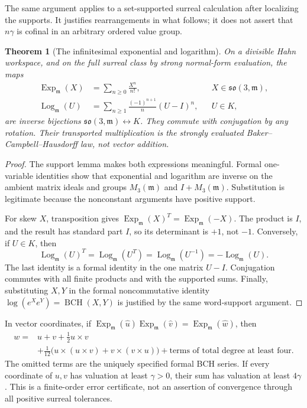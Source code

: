\documentclass[11pt,letterpaper]{article}
\numberwithin{equation}{section}
\newtheorem{theorem}{Theorem}[section]
\theoremstyle{definition}
\theoremstyle{remark}
\newcommand{\mm}{\mathfrak m}
\newcommand{\so}{\mathfrak{so}}
\newcommand{\Exp}{\operatorname{Exp}}
\newcommand{\Log}{\operatorname{Log}}
\begin{document}
The same argument applies to a set-supported surreal calculation after
localizing the supports. It justifies rearrangements in what follows; it does
not assert that \(n\gamma\) is cofinal in an arbitrary ordered value group.

\begin{theorem}[The infinitesimal exponential and logarithm]\label{e3:so:thm:explog}
On a divisible Hahn workspace, and on the full surreal class by strong
normal-form evaluation, the maps
\begin{align}
 \Exp_{\mm}(X)&=\sum_{n\ge0}\frac{X^n}{n!},
       &&X\in\so(3,\mm),\label{e3:so:eq:infexp}\\
 \Log_{\mm}(U)&=\sum_{n\ge1}\frac{(-1)^{n+1}}n(U-I)^n,
       &&U\in K,\label{e3:so:eq:inflog}
\end{align}
are inverse bijections \(\so(3,\mm)\leftrightarrow K\).
They commute with conjugation by any rotation. Their transported multiplication
is the strongly evaluated Baker--Campbell--Hausdorff law, not vector addition.
\end{theorem}
\begin{proof}
The support lemma makes both expressions meaningful. Formal one-variable
identities show that exponential and logarithm are inverse on the ambient
matrix ideals and groups \(M_3(\mm)\) and \(I+M_3(\mm)\). Substitution is
legitimate because the nonconstant arguments have positive support.

For skew \(X\), transposition gives \(\Exp_{\mm}(X)^T=\Exp_{\mm}(-X)\).
The product is \(I\), and the result has standard part \(I\), so its determinant
is \(+1\), not \(-1\). Conversely, if \(U\in K\), then
\[
 \Log_{\mm}(U)^T=\Log_{\mm}(U^T)
 =\Log_{\mm}(U^{-1})=-\Log_{\mm}(U).
\]
The last identity is a formal identity in the one matrix \(U-I\).
Conjugation commutes with all finite products and with the supported sums.
Finally, substituting \(X,Y\) in the formal noncommutative identity
\(\log(e^Xe^Y)=\operatorname{BCH}(X,Y)\) is justified by the same word-support
argument.
\end{proof}

In vector coordinates, if
\(\Exp_{\mm}(\widehat u)\Exp_{\mm}(\widehat v)
 =\Exp_{\mm}(\widehat w)\), then
\begin{equation}\label{e3:so:eq:bchvector}
\begin{split}
 w={}&u+v+\tfrac12u\times v\\
 &+\tfrac1{12}\bigl(u\times(u\times v)+v\times(v\times u)\bigr)
 +\text{terms of total degree at least four}.
\end{split}
\end{equation}
The omitted terms are the uniquely specified formal BCH series. If every
coordinate of \(u,v\) has valuation at least \(\gamma>0\), their sum has
valuation at least \(4\gamma\). This is a finite-order error certificate, not
an assertion of convergence through all positive surreal tolerances.
\end{document}
